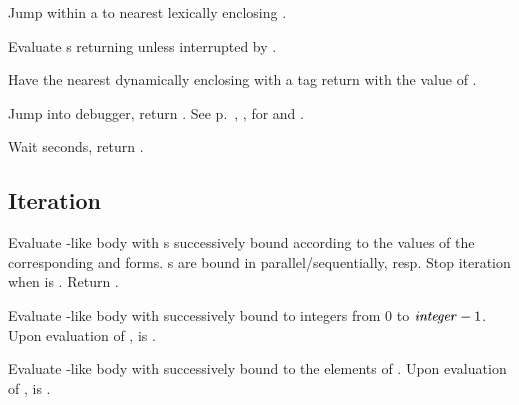 \begin{LIST}{1cm}
   Jump within a  to nearest
  lexically enclosing  .

    Evaluate s returning
   unless interrupted by .

   Have the nearest dynamically
  enclosing  with a tag   return with the
  value of .

  Jump into debugger, return \retval{\NIL}.
  See p.\ \pageref{section:Format}, , for 
  and . 

   Wait  seconds, return \retval{\NIL}.

\end{LIST}



\subsection{Iteration}

\begin{LIST}{1cm}
  
  Evaluate -like body with s successively bound according
  to the values of the corresponding  and 
  forms. s are bound in parallel/sequentially, resp.
  Stop iteration when  is \T. Return .

  Evaluate -like body with  successively bound
  to integers from 0 to $\mbox{\VAR{integer}} - 1$. Upon evaluation of
  ,  is \NIL.

  Evaluate -like body with  successively bound
  to the elements of . Upon evaluation of
  ,  is \NIL.


\end{LIST}


